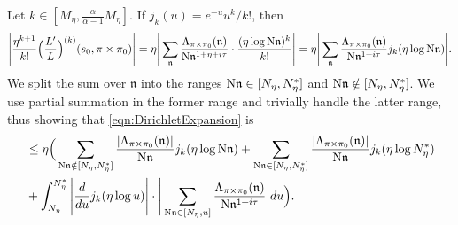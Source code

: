 \documentclass[11pt]{amsart}
\theoremstyle{remark}
\numberwithin{equation}{section}
\newcommand{\kn}{\mathfrak{n}}
\newcommand{\N}{\textnormal{N}}
\begin{document}
Let $k\in[M_{\eta},\frac{\alpha}{\alpha-1}M_{\eta}]$.  If $j_k(u)=e^{-u}u^k/k!$, then
\begin{equation}
\label{eqn:DirichletExpansion}
\Bigg|\frac{\eta^{k+1}}{k!}\Big(\frac{L'}{L}\Big)^{(k)}(s_0,\pi\times\pi_0)\Bigg|=\eta\Bigg|\sum_{\kn}\frac{\Lambda_{\pi\times\pi_0}(\kn)}{\N\kn^{1+\eta+i\tau}}\cdot\frac{(\eta\log\N\kn)^k}{k!}\Bigg|=\eta\Bigg|\sum_{\kn}\frac{\Lambda_{\pi\times\pi_0}(\kn)}{\N\kn^{1+i\tau}}j_k(\eta\log \N\kn)\Bigg|.
\end{equation}
We split the sum over $\kn$ into the ranges $\N\kn\in[N_{\eta},N_{\eta}^*]$ and $\N\kn\notin[N_{\eta},N_{\eta}^*]$.  We use partial summation in the former range and trivially handle the latter range, thus showing that \eqref{eqn:DirichletExpansion} is
\begin{equation}
\begin{aligned}
&\leq \eta\Big(\sum_{\N\kn\notin[N_{\eta},N_{\eta}^*]}\frac{|\Lambda_{\pi\times\pi_0}(\kn)|}{\N\kn}j_k(\eta\log\N\kn)+\sum_{\N\kn\in [N_{\eta},N_{\eta}^*]}\frac{|\Lambda_{\pi\times\pi_0}(\kn)|}{\N\kn}j_k(\eta\log N_{\eta}^*)\\
&+\int_{N_{\eta}}^{N_{\eta}^*}\Bigg|\frac{d}{du}j_k(\eta\log u)\Bigg|\cdot\Bigg|\sum_{\N\kn\in[N_{\eta},u]}\frac{\Lambda_{\pi\times\pi_0}(\kn)}{\N\kn^{1+i\tau}}\Bigg|du\Big).
\end{aligned}
\end{equation}
\end{document}
